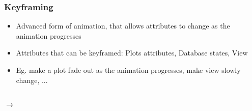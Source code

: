 \begin{frame}
\frametitle{Keyframing}
\vspace{-2mm}
\begin{itemize}
	\item Advanced form of animation, that allows attributes to change as the animation progresses
	\item Attributes that can be keyframed: Plots attributes, Database states, View
	\item Eg. make a plot fade out as the animation progresses, make view slowly change, ...
\end{itemize}
\vspace{-1.75mm}
\begin{columns}[T]
\begin{column}{5.35cm}
	\pause
	\textcolor{DarkBlue}{}
	 $\rightarrow$ 


\end{column}
\end{columns}
\end{frame}

